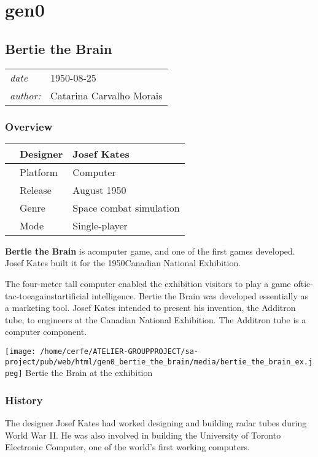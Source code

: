 \documentclass[a4paper,10pt]{book}
\newcommand{\pageHeader}[4]{
    \section{#1}
    \vspace{-0.3cm}
    \begin{table}[h!]
     \begin{tabular}{ll}
        \hline
        \textit{date} & #2 \\
        \textit{author: } & #3\\
        \hline
     \end{tabular}
    \end{table}
    \vspace{-0.3cm}
}
\begin{document}
\tableofcontents
\chapter{gen0}\newpage\pageHeader{Bertie the Brain}{1950-08-25}{Catarina Carvalho Morais}{Bertie the Brain, an early computer game created in 1950}
 \subsection{Overview }
 \begin{longtable}{p{1mm}|l|l|}\hline
 
 & Designer 
 & Josef Kates 
 \\\hline
 
 & Platform 
 & Computer 
 \\\hline
 
 & Release 
 & August 1950 
 \\\hline
 
 & Genre 
 & Space combat simulation 
 \\\hline
 
 & Mode 
 & Single-player 
 \\\hline
 \end{longtable}
 
 
 \textbf{Bertie the Brain }  is acomputer game, and one of the first games developed. Josef Kates built it for the 1950Canadian National Exhibition.
          
 
           The four-meter tall computer enabled the exhibition visitors to play a game oftic-tac-toeagainstartificial intelligence. Bertie the Brain was developed essentially as a marketing tool. Josef Kates intended to present his invention, the Additron tube, to engineers at the Canadian National Exhibition. The Additron tube is a computer component.
          
 
 
 \texttt{[image: /home/cerfe/ATELIER-GROUPPROJECT/sa-project/pub/web/html/gen0\_bertie\_the\_brain/media/bertie\_the\_brain\_ex.jpeg]}
 Bertie the Brain at the exhibition 
 
 \subsection{History }
 
            The designer Josef Kates had worked designing and building radar tubes during World War II. He was also involved in building the University of Toronto Electronic Computer, one of the world's first working computers.
           
\end{document}
